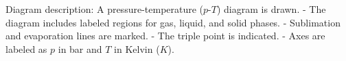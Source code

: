 Diagram description:  
A pressure-temperature (\( p \)-\( T \)) diagram is drawn.  
- The diagram includes labeled regions for gas, liquid, and solid phases.  
- Sublimation and evaporation lines are marked.  
- The triple point is indicated.  
- Axes are labeled as \( p \) in bar and \( T \) in Kelvin (\( K \)).
